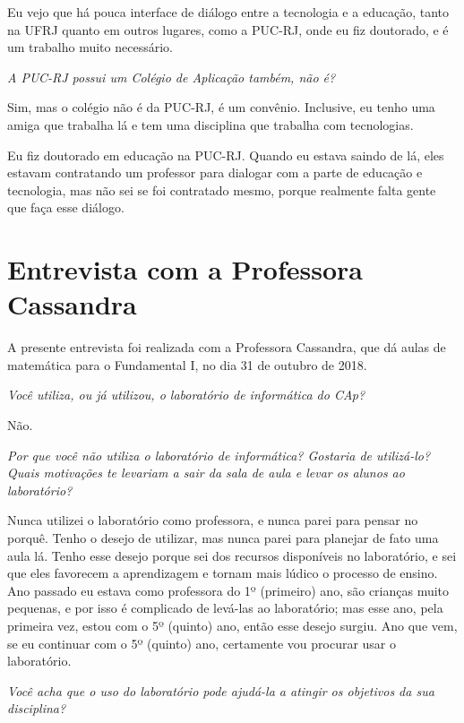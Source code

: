 Eu vejo que há pouca interface de diálogo entre a tecnologia e a educação, tanto na UFRJ quanto em outros lugares, como a PUC-RJ, onde eu fiz doutorado, e é um trabalho muito necessário.

\textit{A PUC-RJ possui um Colégio de Aplicação também, não é?}

Sim, mas o colégio não é da PUC-RJ, é um convênio. Inclusive, eu tenho uma amiga que trabalha lá e tem uma disciplina que trabalha com tecnologias.

Eu fiz doutorado em educação na PUC-RJ. Quando eu estava saindo de lá, eles estavam contratando um professor para dialogar com a parte de educação e tecnologia, mas não sei se foi contratado mesmo, porque realmente falta gente que faça esse diálogo.


\section{Entrevista com a Professora Cassandra}\label{chp:LABEL_CHP_ENT_SEC_CASS}

A presente entrevista foi realizada com a Professora Cassandra, que dá aulas de matemática para o Fundamental I, no dia 31 de outubro de 2018.

\textit{Você utiliza, ou já utilizou, o laboratório de informática do CAp?}

Não.

\textit{Por que você não utiliza o laboratório de informática? Gostaria de utilizá-lo? Quais motivações te levariam a sair da sala de aula e levar os alunos ao laboratório?}

Nunca utilizei o laboratório como professora, e nunca parei para pensar no porquê. Tenho o desejo de utilizar, mas nunca parei para planejar de fato uma aula lá. Tenho esse desejo porque sei dos recursos disponíveis no laboratório, e sei que eles favorecem a aprendizagem e tornam mais lúdico o processo de ensino. Ano passado eu estava como professora do 1º (primeiro) ano, são crianças muito pequenas, e por isso é complicado de levá-las ao laboratório; mas esse ano, pela primeira vez, estou com o 5º (quinto) ano, então esse desejo surgiu. Ano que vem, se eu continuar com o 5º (quinto) ano, certamente vou procurar usar o laboratório.

\textit{Você acha que o uso do laboratório pode ajudá-la a atingir os objetivos da sua disciplina?}

